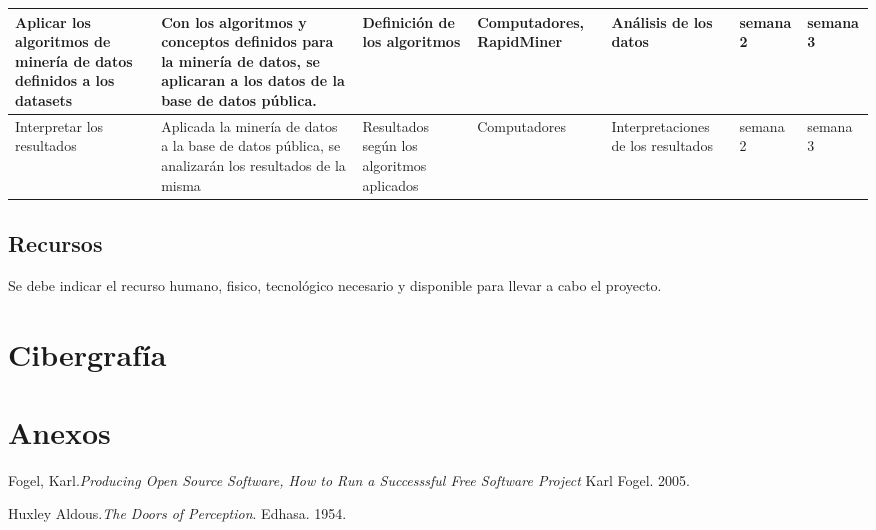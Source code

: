 \documentclass[a4paper, 11pt, oneside]{article}
\theoremstyle{definition}
\theoremstyle{remark}
\begin{document}
\begin{sidewaystable}
\begin{center}
\begin{tabular}{p{4cm} p{4cm} p{4cm} p{4cm} p{3cm} p{2cm} p{2cm} }
\midrule
Aplicar los algoritmos de minería de datos definidos a los datasets & Con los algoritmos y conceptos definidos para la minería de datos, se aplicaran a los datos de la base de datos pública. & Definición de los algoritmos & Computadores, RapidMiner & Análisis de los datos & semana 2 & semana 3 \\

\midrule
Interpretar los resultados & Aplicada la minería de datos a la base de datos pública, se analizarán los resultados de la misma & Resultados según los algoritmos aplicados & Computadores & Interpretaciones de los resultados & semana 2 & semana 3 \\

\bottomrule
\end{tabular}

\end{center}
\end{sidewaystable}
\clearpage

\begin{center}
\section{Recursos}
\end{center}
Se debe indicar el recurso humano, fisico, tecnológico necesario y disponible para llevar a cabo el
proyecto.
\clearpage

\begin{center}
\section{Cibergrafía}
\section{Anexos}
\end{center}
\clearpage




\begin{thebibliography}{99}


 Fogel, Karl.\emph{Producing Open Source Software, How to Run a
Successsful Free Software Project} Karl Fogel. 2005.

 Huxley Aldous.\emph{The Doors of Perception}. Edhasa. 1954.

\end{thebibliography}
\end{document}
